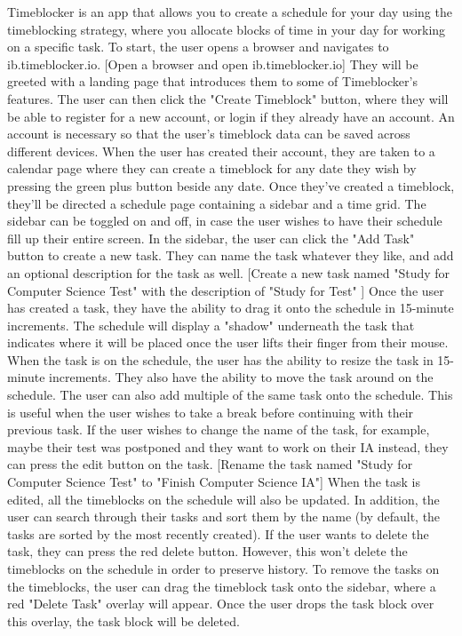 \documentclass[notitlepage]{report}
\begin{document}
\obeylines
Timeblocker is an app that allows you to create a schedule for your day using the timeblocking strategy, where you allocate blocks of time in your day for working on a specific task.
To start, the user opens a browser and navigates to ib.timeblocker.io.
[Open a browser and open ib.timeblocker.io]
They will be greeted with a landing page that introduces them to some of Timeblocker's features.
The user can then click the "Create Timeblock" button, where they will be able to register for a new account, or login if they already have an account.
An account is necessary so that the user's timeblock data can be saved across different devices.
When the user has created their account, they are taken to a calendar page where they can create a timeblock for any date they wish by pressing the green plus button beside any date.
Once they've created a timeblock, they'll be directed a schedule page containing a sidebar and a time grid. The sidebar can be toggled on and off, in case the user wishes to have their schedule fill up their entire screen. In the sidebar, the user can click the "Add Task" button to create a new task. They can name the task whatever they like, and add an optional description for the task as well.
[Create a new task named "Study for Computer Science Test" with the description of "Study for Test" ]
Once the user has created a task, they have the ability to drag it onto the schedule in 15-minute increments. The schedule will display a "shadow" underneath the task that indicates where it will be placed once the user lifts their finger from their mouse. When the task is on the schedule, the user has the ability to resize the task in 15-minute increments. They also have the ability to move the task around on the schedule.
The user can also add multiple of the same task onto the schedule. This is useful when the user wishes to take a break before continuing with their previous task.
If the user wishes to change the name of the task, for example, maybe their test was postponed and they want to work on their IA instead, they can press the edit button on the task.
[Rename the task named "Study for Computer Science Test" to "Finish Computer Science IA"]
When the task is edited, all the timeblocks on the schedule will also be updated.
In addition, the user can search through their tasks and sort them by the name (by default, the tasks are sorted by the most recently created).
If the user wants to delete the task, they can press the red delete button. However, this won't delete the timeblocks on the schedule in order to preserve history. To remove the tasks on the timeblocks, the user can drag the timeblock task onto the sidebar, where a red "Delete Task" overlay will appear. Once the user drops the task block over this overlay, the task block will be deleted.
\end{document}
